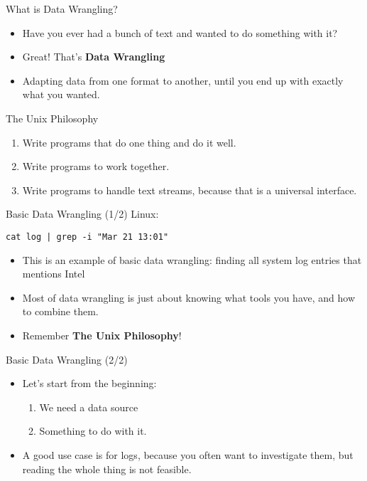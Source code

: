 \documentclass[12pt]{beamer}
\begin{document}
\begin{frame}{What is Data Wrangling?}
  \begin{itemize}
    \item Have you ever had a bunch of text and wanted to do something with it?
    \item Great! That's \textbf{Data Wrangling}
    \item Adapting data from one format to another, until you end up with exactly what you wanted.
  \end{itemize}
\end{frame}


\begin{frame}{The Unix Philosophy}
  \begin{enumerate}
    \item Write programs that do one thing and do it well.
    \item Write programs to work together.
    \item Write programs to handle text streams, because that is a universal interface.
  \end{enumerate}
\end{frame}

\begin{frame}[fragile]{Basic Data Wrangling (1/2)}
  Linux:
  \begin{verbatim}
cat log | grep -i "Mar 21 13:01"
  \end{verbatim}
  \begin{itemize}
    \item This is an example of basic data wrangling: finding all system log entries that mentions Intel
    \item Most of data wrangling is just about knowing what tools you have, and how to combine them.
    \item Remember \textbf{The Unix Philosophy}!
  \end{itemize}
\end{frame}

\begin{frame}{Basic Data Wrangling (2/2)}
  \begin{itemize}
    \item Let's start from the beginning:
          \begin{enumerate}
            \item We need a data source
            \item Something to do with it.
          \end{enumerate}
    \item A good use case is for logs, because you often want to investigate them, but reading the whole thing is not feasible.
  \end{itemize}
\end{frame}
\end{document}
